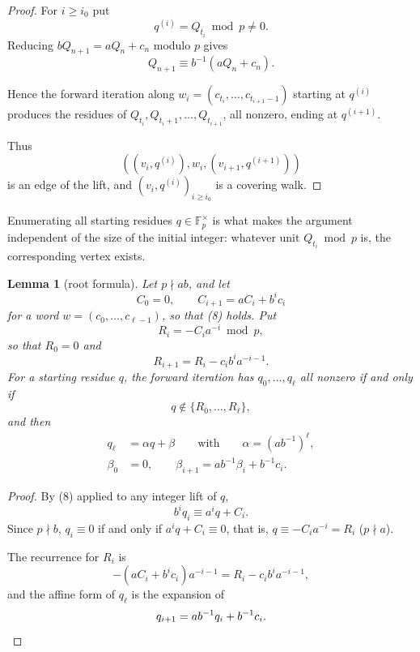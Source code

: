 \documentclass[11pt,reqno]{amsart}
\newtheorem{lemma}[theorem]{Lemma}
\theoremstyle{definition}
\theoremstyle{remark}
\begin{document}
\begin{proof}\leavevmode\label{proof:17}
For \(i\ge i_0\) put
\[
q^{(i)}=Q_{t_i}\bmod p\ne0.
\]
Reducing
\(bQ_{n+1}=aQ_n+c_n\) modulo \(p\) gives
\[
Q_{n+1}\equiv b^{-1}(aQ_n+c_n).
\]

Hence the forward iteration along
\(w_i=(c_{t_i},\ldots,c_{t_{i+1}-1})\)
starting at \(q^{(i)}\) produces
the residues of \(Q_{t_i},Q_{t_i+1},\ldots,Q_{t_{i+1}}\), all nonzero,
ending at \(q^{(i+1)}\).

Thus
\[
((v_i,q^{(i)}),w_i,(v_{i+1},q^{(i+1)}))
\]
is an edge of the lift, and
\((v_i,q^{(i)})_{i\ge i_0}\) is a covering walk. \qedhere
\end{proof}

Enumerating all starting residues \(q\in\mathbb F_p^\times\) is what makes
the argument independent of the size of the initial integer: whatever
unit \(Q_{t_i}\bmod p\) is, the corresponding vertex exists.

\begin{samepage}
\begin{lemma}[root formula]\leavevmode\label{thm:18}
Let \(p\nmid ab\), and let
\[
C_0=0,\qquad C_{i+1}=aC_i+b^ic_i
\]
for a word
\(w=(c_0,\ldots,c_{\ell-1})\), so that (8) holds. Put
\[
R_i=-C_ia^{-i}\bmod p,
\]
so that \(R_0=0\) and
\[
R_{i+1}=R_i-c_ib^ia^{-i-1}.
\]
For a starting residue \(q\), the forward
iteration has \(q_0,\ldots,q_\ell\) all nonzero if and only if
\[
q\notin\{R_0,\ldots,R_\ell\},
\]
and then
\[
\begin{aligned}
q_\ell&=\alpha q+\beta\qquad \text{with}\qquad \alpha=(ab^{-1})^\ell,\\
\beta_0&=0,\qquad \beta_{i+1}=ab^{-1}\beta_i+b^{-1}c_i.
\end{aligned}
\]
\label{thm-end:18}
\end{lemma}
\end{samepage}

\begin{proof}\leavevmode\label{proof:18}
By (8) applied to any integer lift of \(q\),
\[
b^iq_i\equiv a^iq+C_i.
\]
Since \(p\nmid b\), \(q_i\equiv0\) if and
only if \(a^iq+C_i\equiv0\), that is, \(q\equiv-C_ia^{-i}=R_i\)
(\(p\nmid a\)).

The recurrence for \(R_i\) is
\[
-(aC_i+b^ic_i)a^{-i-1}=R_i-c_ib^ia^{-i-1},
\]
and the affine form of
\(q_\ell\) is the expansion of
\[
q_{i+1}=ab^{-1}q_i+b^{-1}c_i.\qedhere
\]
\end{proof}
\end{document}
